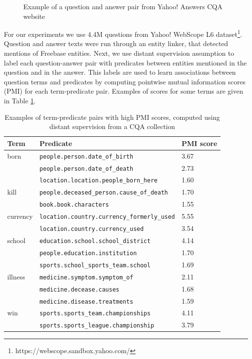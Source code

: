 \begin{figure}
\centering
{}
\caption{Example of a question and answer pair from Yahoo! Answers CQA website}
\label{figure:text2kb:cqa_example}
\end{figure}

For our experiments we use 4.4M questions from Yahoo! WebScope L6 dataset\footnote{https://webscope.sandbox.yahoo.com/}.
Question and answer texts were run through an entity linker, that detected mentions of Freebase entities.
Next, we use distant supervision assumption to label each question-answer pair with predicates between entities mentioned in the question and in the answer.
This labels are used to learn associations between question terms and predicates by computing pointwise mutual information scores (PMI) for each term-predicate pair.
Examples of scores for some terms are given in Table \ref{table:text2kb:cqa_npmi}.

\begin{table}
\centering
\begin{tabular}{| p{2cm} | p{8.5cm} | p{1cm} |}
\hline
Term & Predicate & PMI score\\
\hline
born & \texttt{people.person.date\_of\_birth} & 3.67\\
 & \texttt{people.person.date\_of\_death} & 2.73\\
 & \texttt{location.location.people\_born\_here} & 1.60\\
\hline
kill & \texttt{people.deceased\_person.cause\_of\_death} & 1.70\\
& \texttt{book.book.characters} & 1.55\\
\hline
currency & \texttt{location.country.currency\_formerly\_used} & 5.55 \\
& \texttt{location.country.currency\_used} & 3.54 \\
\hline
school & \texttt{education.school.school\_district} & 4.14 \\
& \texttt{people.education.institution} & 1.70\\
& \texttt{sports.school\_sports\_team.school} & 1.69 \\
\hline
illness & \texttt{medicine.symptom.symptom\_of} & 2.11\\
& \texttt{medicine.decease.causes} & 1.68\\
& \texttt{medicine.disease.treatments} & 1.59\\
\hline
win & \texttt{sports.sports\_team.championships} & 4.11\\
& \texttt{sports.sports\_league.championship} & 3.79\\
\hline
\end{tabular}
\caption{Examples of term-predicate pairs with high PMI scores, computed using distant supervision from a CQA collection}
\label{table:text2kb:cqa_npmi}
\end{table}

